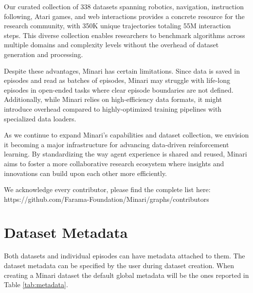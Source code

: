 \documentclass{article}
\begin{document}
Our curated collection of 338 datasets spanning robotics, navigation, instruction following, Atari games, and web interactions provides a concrete resource for the research community, with 350K unique trajectories totaling 55M interaction steps. This diverse collection enables researchers to benchmark algorithms across multiple domains and complexity levels without the overhead of dataset generation and processing.

Despite these advantages, Minari has certain limitations. Since data is saved in episodes and read as batches of episodes, Minari may struggle with life-long episodes in open-ended tasks where clear episode boundaries are not defined. Additionally, while Minari relies on high-efficiency data formats, it might introduce overhead compared to highly-optimized training pipelines with specialized data loaders.

As we continue to expand Minari's capabilities and dataset collection, we envision it becoming a major infrastructure for advancing data-driven reinforcement learning. By standardizing the way agent experience is shared and reused, Minari aims to foster a more collaborative research ecosystem where insights and innovations can build upon each other more efficiently.

\begin{ack}
We acknowledge every contributor, please find the complete list here: https://github.com/Farama-Foundation/Minari/graphs/contributors
\end{ack}






\appendix


\section{Dataset Metadata}

Both datasets and individual episodes can have metadata attached to them. The dataset metadata can be specified by the user during dataset creation. When creating a Minari dataset the default global metadata will be the ones reported in Table \ref{tab:metadata}.
\end{document}
